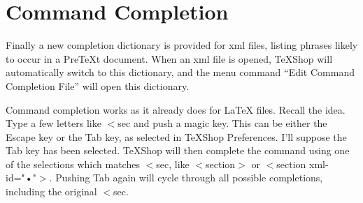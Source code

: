 \documentclass[11pt, oneside]{article}   	%
\begin{document}
\section{Command Completion}

Finally a new completion dictionary is provided for xml files, listing phrases likely to occur in a PreTeXt document. When an xml file is opened, TeXShop will automatically switch to this dictionary, and the menu command ``Edit Command Completion File'' will open this dictionary. 
 
Command completion works as it already does for LaTeX files. Recall the idea. Type a few letters like
$<$sec and push a magic key. This can be either the Escape key or the Tab key, as selected in TeXShop Preferences. I'll suppose the Tab key has been selected. TeXShop will then complete the command using one of the selections which matches $<$sec, like $<$section$>$ or $<$section xml-id="•"$>$. Pushing Tab again will cycle through all possible completions, including the original $<$sec. 

%
%
%
%
\end{document}
